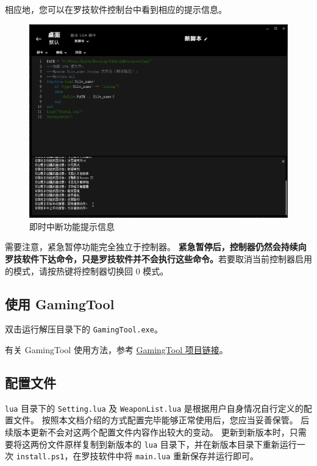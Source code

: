 相应地，您可以在罗技软件控制台中看到相应的提示信息。

\begin{figure}[H]
    \Centering
    \includegraphics[width=\textwidth]{docs/assets/interrupt.png}
    \caption{即时中断功能提示信息}
\end{figure}

需要注意，紧急暂停功能完全独立于控制器。
\textbf{\color{red}紧急暂停后，控制器仍然会持续向罗技软件下达命令，只是罗技软件并不会执行这些命令。}若要取消当前控制器启用的模式，请按热键将控制器切换回 0 模式。

\subsection{使用 GamingTool}

双击运行解压目录下的 \lstinline{GamingTool.exe}。

有关 GamingTool 使用方法，参考 \href{https://gitee.com/silver1867/gaming-tool}{GamingTool 项目链接}。

\subsection{配置文件}

\lstinline{lua} 目录下的 \lstinline{Setting.lua} 及 \lstinline{WeaponList.lua} 是根据用户自身情况自行定义的配置文件。
按照本文档介绍的方式配置完毕能够正常使用后，您应当妥善保管。
后续版本更新不会对这两个配置文件内容作出较大的变动。
更新到新版本时，只需要将这两份文件原样复制到新版本的 \lstinline{lua} 目录下，并在新版本目录下重新运行一次 \lstinline{install.ps1}，在罗技软件中将 \lstinline{main.lua} 重新保存并运行即可。

